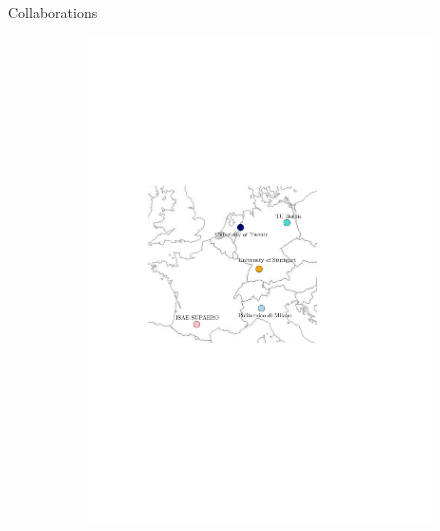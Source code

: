 \documentclass[aspectratio=169, french]{beamer}
\begin{document}
\begin{frame}{Collaborations}
\begin{figure}[t]
	\begin{subfigure}{0.5\textwidth}
		\includegraphics[width=.95\textwidth]{mappe_reseau_europe.pdf}%
	\end{subfigure}\hfill
	\begin{subfigure}{0.4\textwidth}

\end{subfigure}
\end{figure}
\end{frame}
\end{document}
